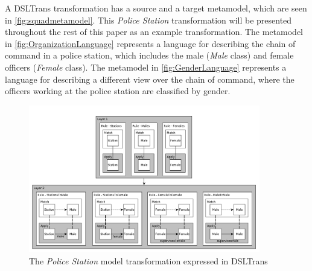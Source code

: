 


A DSLTrans transformation has a source and a target metamodel, which are seen
in \cref{fig:squadmetamodel}. This \emph{Police Station}
transformation will be presented throughout
the rest of this paper as an example transformation. The metamodel
in \cref{fig:OrganizationLanguage} represents a language for describing
the chain of command in a police station, which includes the male (\emph{Male}
class) and female officers (\emph{Female} class). The metamodel in
\cref{fig:GenderLanguage} represents a language for describing a different
view over the chain of command, where the officers working at the police station
are classified by gender.

\begin{figure}[bht]
	\centering
		\includegraphics[width=0.9\textwidth]{./figures/policestation_dsltrans/transformation.pdf}
	\caption{The \emph{Police Station} model transformation expressed in DSLTrans}
	\label{fig:dsltransformation}
\end{figure}

